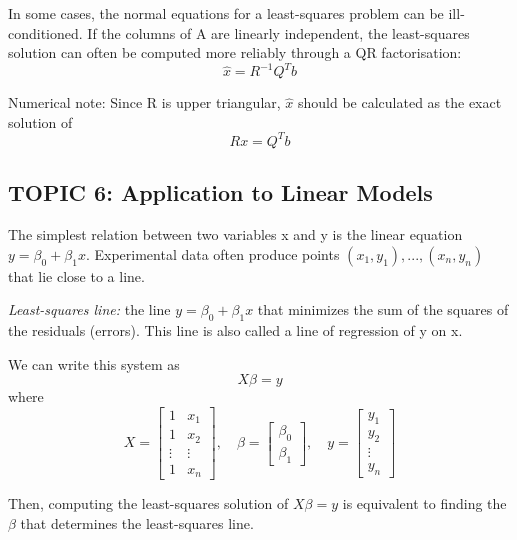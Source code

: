 \documentclass[12pt]{article} %
\begin{document}
In some cases, the normal equations for a least-squares problem can be ill-conditioned. If the columns of A are linearly independent, the least-squares solution can often be computed more reliably through a QR factorisation:
$$\hat{x} = R^{-1} Q^T b$$

Numerical note: Since R is upper triangular, $\hat{x}$ should be calculated as the exact solution of 
$$Rx = Q^T b$$
\subsection{TOPIC 6: Application to Linear Models}
The simplest relation between two variables x and y is the linear equation $y = \beta_0 + \beta_1 x$. Experimental data often produce points $(x_1, y_1), ..., (x_n, y_n)$ that lie close to a line.

\emph{Least-squares line:} the line $y = \beta_0 + \beta_1 x$ that minimizes the sum of the squares of the residuals (errors). This line is also called a line of regression of y on x. 

We can write this system as 
$$X\beta = y$$
where
$$X = \begin{bmatrix}
		1 & x_1\\
		1 & x_2\\
		\vdots & \vdots\\
		1 & x_n
	\end{bmatrix}, \quad \beta = \begin{bmatrix}
		\beta_0 \\ \beta_1
	\end{bmatrix}, \quad y = \begin{bmatrix}
		y_1 \\ y_2\\ \vdots \\ y_n
	\end{bmatrix}$$

Then, computing the least-squares solution of $X\beta = y$ is equivalent to finding the $\beta$ that determines the least-squares line. 
\end{document}
